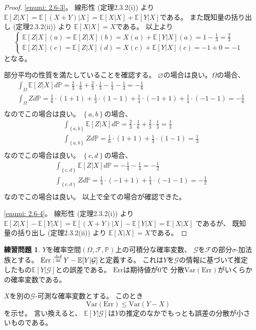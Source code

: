 \documentclass[uplatex]{jsarticle}
\theoremstyle{definition}
\newtheorem{prob}[prob]{練習問題}
\renewcommand{\emptyset}{\varnothing}
\def\P{\mathbb{P}}
\def\E{\mathbb{E}}
\def\mcF{\mathcal{F}}
\def\mcG{\mathcal{G}}
\def\dfn{:\overset{\mbox{{\scriptsize def}}}{=}}
\newcommand{\Var}{\mathrm{Var}}
\begin{document}
\begin{proof}
  \ref{enumi: 2.6-3}。
  線形性 (定理2.3.2(i)) より
  \(\E[Z|X] = \E[(X+Y)|X] = \E[X|X] + \E[Y|X]\)である。
  また既知量の括り出し (定理2.3.2(ii)) より
  \(\E[X|X]=X\)である。
  以上より
  \[
  \begin{cases}
    \E[Z|X](a) = \E[Z|X](b)
    = X(a) + \E[Y|X](a) = 1 - \frac{1}{3} = \frac{2}{3} \\
    \E[Z|X](c) = \E[Z|X](d)
    = X(c) + \E[Y|X](c) = -1 + 0 = -1
  \end{cases}
  \]
  となる。

  部分平均の性質を満たしていることを確認する。
  \(\emptyset\)の場合は良い。\(\Omega\)の場合、
  \begin{align*}
    &\int_{\Omega}\E[Z|X]d\P
    = \frac{2}{3}\cdot \frac{1}{6}
    + \frac{2}{3}\cdot \frac{1}{3}
    - \frac{1}{4} - \frac{1}{4}
    = - \frac{1}{6} \\
    &\int_{\Omega}Zd\P
    = \frac{1}{6}\cdot (1+1)
    + \frac{1}{3}\cdot (1-1)
    + \frac{1}{4}\cdot (-1+1)
    + \frac{1}{4}\cdot (-1-1)
    = - \frac{1}{6} \\
  \end{align*}
  なのでこの場合は良い。
  \(\left\{a,b\right\}\)の場合、
  \begin{align*}
    &\int_{\left\{a,b\right\}}\E[Z|X]d\P
    = \frac{2}{3}\cdot \frac{1}{6}
    + \frac{2}{3}\cdot \frac{1}{3}
    = \frac{1}{3} \\
    &\int_{\left\{a,b\right\}}Zd\P
    = \frac{1}{6}\cdot (1+1)
    + \frac{1}{3}\cdot (1-1)
    = \frac{1}{3} \\
  \end{align*}
  なのでこの場合は良い。
  \(\left\{c,d\right\}\)の場合、
  \begin{align*}
    &\int_{\left\{c,d\right\}}\E[Z|X]d\P
    = -\frac{1}{4}
    -\frac{1}{4}
    = -\frac{1}{2} \\
    &\int_{\left\{c,d\right\}}Zd\P
    = \frac{1}{4}\cdot (-1+1)
    + \frac{1}{4}\cdot (-1-1)
    = -\frac{1}{2} \\
  \end{align*}
  なのでこの場合は良い。
  以上で全ての場合が確認できた。

  \ref{enumi: 2.6-4}。
  線形性 (定理2.3.2(i)) より
  \(\E[Z|X] - \E[Y|X] = \E[(X+Y)|X] - \E[Y|X] = \E[X|X]\)
  であるが、
  既知量の括り出し (定理2.3.2(ii)) より
  \(\E[X|X] = X\)である。
\end{proof}


\begin{prob}\label{prob: 2.7}
  \(Y\)を確率空間\((\Omega,\mcF,\P)\)上の可積分な確率変数、
  \(\mcG\)を\(\mcF\)の部分\(\sigma\)-加法族とする。
  \(\mathrm{Err} \dfn Y-\E[Y|\mcG]\)と定義する。
  これは\(Y\)を\(\mcG\)の情報に基づいて推定したもの\(\E[Y|\mcG]\)との誤差である。
  \(\mathrm{Err}\)は期待値が\(0\)で
  分散\(\Var(\mathrm{Err})\)がいくらかの確率変数である。

  \(X\)を別の\(\mcG\)-可測な確率変数とする。
  このとき
  \[
  \Var(\mathrm{Err}) \leq \Var(Y-X)
  \]
  を示せ。
  言い換えると、
  \(\E[Y|\mcG]\)は\(Y\)の推定のなかでもっとも誤差の分散が小さいものである。
\end{prob}
\end{document}
